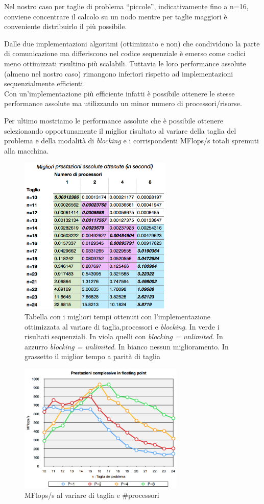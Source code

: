 \documentclass[12pt,a4paper,oneside,openright]{article}
\begin{document}
Nel nostro caso per taglie di problema ``piccole'', indicativamente fino a n=16, conviene concentrare il calcolo su un nodo mentre per taglie maggiori è conveniente distribuirlo il più possibile.

Dalle  due implementazioni algoritmi (ottimizzato e non) che condividono la parte di comunicazione ma differiscono nel codice sequenziale è emerso come codici meno ottimizzati risultino più scalabili. Tuttavia le loro performance assolute (almeno nel nostro caso) rimangono inferiori rispetto ad implementazioni sequenzialmente efficienti.\\ Con un'implementazione più efficiente infatti è possibile ottenere le stesse performance assolute ma utilizzando un minor numero di processori/risorse.

Per ultimo mostriamo le performance assolute che è possibile ottenere selezionando opportunamente il miglior risultato al variare della taglia del problema e della modalità di \emph{blocking} e i corrispondenti MFlops/s totali spremuti alla macchina.
\begin{figure}[htp] 
  \centering
  \linespread{1}
      \includegraphics[width=0.65\textwidth]{immagini/best_performance}
  \caption{\small Tabella con i migliori tempi ottenuti con l'implementazione ottimizzata al variare di taglia,processori e \emph{blocking}. In verde i risultati sequenziali. In viola quelli con \emph{blocking = unlimited}. In azzurro \emph{blocking = unlimited}. In bianco nessun miglioramento. In grassetto il miglior tempo a parità di taglia}
\end{figure}

\begin{figure}[htp] 
  \centering
      \includegraphics[width=0.70\textwidth]{immagini/mflips}
  \caption{\small MFlops/s al variare di taglia e \#processori}
\end{figure}
\end{document}
